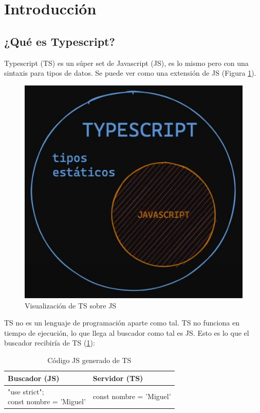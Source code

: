 \section{Introducción}


\subsection{¿Qué es Typescript?}

Typescript (TS) es un súper set de Javascript (JS), es lo mismo pero con una sintaxis para tipos de datos. Se puede ver como una extensión de JS (Figura \ref{fig:1}).
\begin{figure}[H]
    \centering
    \caption{Visualización de TS sobre JS}
    \label{fig:1}
    \includegraphics[width=\textwidth]{ss/1.png}
\end{figure}

TS no es un lenguaje de programación aparte como tal. TS no funciona en tiempo de ejecución, lo que llega al buscador como tal es JS. Esto es lo que el buscador recibiría de TS (\ref{tab:1}):
\begin{table}[H]
    \centering
    \caption{Código JS generado de TS}
    \label{tab:1}
    \begin{tabular}{|m{7cm}|m{7cm}|}
        \hline
        \textbf{Buscador (JS)} & \textbf{Servidor (TS)} \\
        \hline
        \parbox{7cm}{"use strict"; \\ const nombre = 'Miguel'} & const nombre = 'Miguel' \\
        \hline
    \end{tabular}
\end{table}


